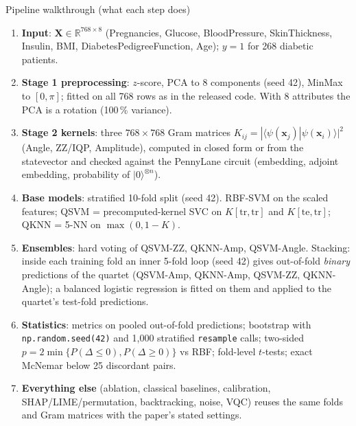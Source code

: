 \documentclass[aspectratio=169,10pt,t,xcolor={table}]{beamer}
\newcommand{\code}[1]{\texttt{\small #1}}
\begin{document}
\begin{frame}{Pipeline walkthrough (what each step does)}
\begin{enumerate}\footnotesize
  \item \textbf{Input}: $\mathbf{X}\in\mathbb{R}^{768\times8}$ (Pregnancies, Glucose, BloodPressure, SkinThickness, Insulin, BMI, DiabetesPedigreeFunction, Age); $y=1$ for 268 diabetic patients.
  \item \textbf{Stage 1 preprocessing}: $z$-score, PCA to 8 components (seed 42), MinMax to $[0,\pi]$; fitted on all 768 rows as in the released code. With 8 attributes the PCA is a rotation (100\,\% variance).
  \item \textbf{Stage 2 kernels}: three $768\times768$ Gram matrices $K_{ij}=|\langle\psi(\mathbf{x}_j)|\psi(\mathbf{x}_i)\rangle|^2$ (Angle, ZZ/IQP, Amplitude), computed in closed form or from the statevector and checked against the PennyLane circuit (embedding, adjoint embedding, probability of $|0\rangle^{\otimes n}$).
  \item \textbf{Base models}: stratified 10-fold split (seed 42). RBF-SVM on the scaled features; QSVM = precomputed-kernel SVC on $K[\mathrm{tr},\mathrm{tr}]$ and $K[\mathrm{te},\mathrm{tr}]$; QKNN = 5-NN on $\max(0,1-K)$.
  \item \textbf{Ensembles}: hard voting of QSVM-ZZ, QKNN-Amp, QSVM-Angle. Stacking: inside each training fold an inner 5-fold loop (seed 42) gives out-of-fold \emph{binary} predictions of the quartet (QSVM-Amp, QKNN-Amp, QSVM-ZZ, QKNN-Angle); a balanced logistic regression is fitted on them and applied to the quartet's test-fold predictions.
  \item \textbf{Statistics}: metrics on pooled out-of-fold predictions; bootstrap with \code{np.random.seed(42)} and 1,000 stratified \code{resample} calls; two-sided $p=2\min\{P(\Delta\le0),P(\Delta\ge0)\}$ vs RBF; fold-level $t$-tests; exact McNemar below 25 discordant pairs.
  \item \textbf{Everything else} (ablation, classical baselines, calibration, SHAP/LIME/permutation, backtracking, noise, VQC) reuses the same folds and Gram matrices with the paper's stated settings.
\end{enumerate}
\end{frame}
\end{document}
